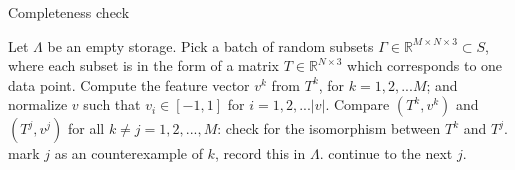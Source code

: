 \documentclass[12pt]{article}
\begin{document}
\begin{algorithm}[H]
    \caption{Completeness check}
    \label{alg:completeness_check}
    \begin{algorithmic}[1] 
            \State Let $\Lambda$ be an empty storage.
            \State Pick a batch of random subsets $\Gamma \in \mathbb{R}^{M \times N \times 3} \subset S$, where each subset is in the form of a matrix $T \in \mathbb{R}^{N \times 3}$ which corresponds to one data point.
            \State Compute the feature vector $v^k$ from $T^k$, for $k = 1,2,... M$; and normalize $v$ such that $v_i \in [-1, 1]$ for $i = 1,2,... |v|$.
            \State Compare $(T^k, v^k)$ and $(T^j, v^j)$ for all $k \neq j = 1,2,...,M$:
                    \State check for the isomorphism between $T^k$ and $T^j$.
                        \State mark $j$ as an counterexample of $k$, record this in $\Lambda$.
                        \State continue to the next $j$.
                    \EndIf
                \EndIf
            \EndFor 
        \EndFor
    \end{algorithmic}
\end{algorithm}
\end{document}
